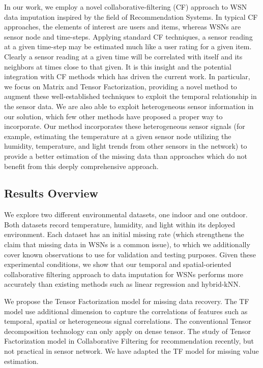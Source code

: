 In our work, we employ a novel collaborative-filtering (CF) approach to WSN data imputation inspired by the field of Recommendation Systems.
In typical CF approaches, the elements of interest are users and items, whereas WSNs are sensor node and time-steps.
Applying standard CF techniques, a sensor reading at a given time-step may be estimated much like a user rating for a given item.
Clearly a sensor reading at a given time will be correlated with itself and its neighbors at times close to that given.
It is this insight and the potential integration with CF methods which has driven the current work.
In particular, we focus on Matrix and Tensor Factorization, providing a novel method to augment these well-established techniques to exploit the temporal relationship in the sensor data.
We are also able to exploit heterogeneous sensor information in our solution, which few other methods have proposed a proper way to incorporate.
Our method incorporates these heterogeneous sensor signals (for example, estimating the temperature at a given sensor node utilizing the humidity, temperature, and light trends from other sensors in the network) to provide a better estimation of the missing data than approaches which do not benefit from this deeply comprehensive approach.

\subsection{Results Overview }
We explore two different environmental datasets, one indoor and one outdoor.
Both datasets record temperature, humidity, and light within its deployed environment.
Each dataset has an initial missing rate (which strengthens the claim that missing data in WSNs is a common issue), to which we additionally cover known observations to use for validation and testing purposes.
Given these experimental conditions, we show that our temporal and spatial-oriented collaborative filtering approach to data imputation for WSNs performs more accurately than existing methods such as linear regression and hybrid-kNN.


We propose the Tensor Factorization model for missing data recovery. The TF model use additional dimension to capture the correlations of features such as temporal, spatial or heterogeneous signal correlations. The conventional Tensor decomposition technology can only apply on dense tensor. The study of Tensor Factorization model in Collaborative Filtering for recommendation recently, but not practical in sensor network. We  have adapted the TF model for missing value estimation. 

